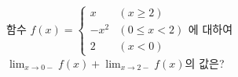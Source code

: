 함수 $f(x)=\begin{cases} x & (x\ge 2) \\ -x^2 & (0\le x<2) \\ 2 & (x<0) \end{cases}$에 대하여 $\displaystyle\lim_{x\to 0-} f(x)+\lim_{x\to 2-} f(x)$의 값은?
